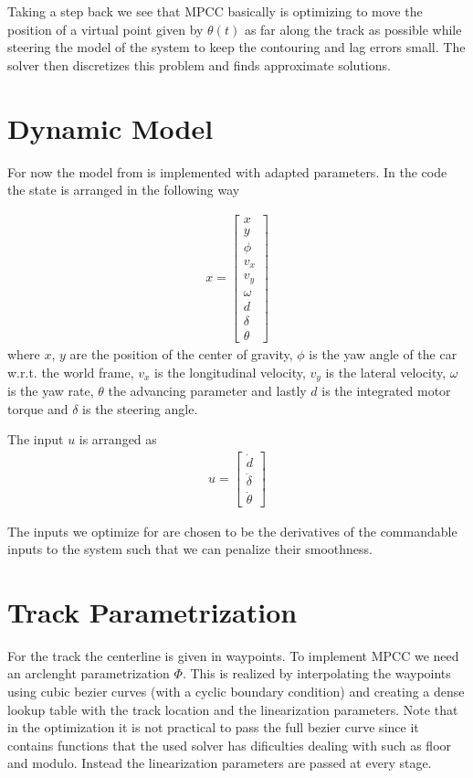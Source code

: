 \documentclass[12pt]{article}
\begin{document}
Taking a step back we see that MPCC basically is optimizing to move the position of a virtual point given by $\theta(t)$ as far along the track as possible while steering the model of the system to keep the contouring and lag errors small. The solver then discretizes this problem and finds approximate solutions.
\section{Dynamic Model}

For now the model from \cite{liniger2015optimization} is implemented with adapted parameters. In the code the state is arranged in the following way

\begin{align}
x = \begin{bmatrix}
x\\
y\\
\phi\\
v_x\\
v_y\\
\omega\\
d\\
\delta\\
\theta
\end{bmatrix}
\end{align}
where $x$, $y$ are the position of the center of gravity, $\phi$ is the yaw angle of the car w.r.t. the world frame, $v_x$ is the longitudinal velocity, $v_y$ is the lateral velocity, $\omega$ is the yaw rate, $\theta$ the advancing parameter and lastly $d$ is the integrated motor torque and $\delta$ is the steering angle.

The input $u$ is arranged as
\begin{align}
u = \begin{bmatrix}
\dot{d}\\
\dot\delta\\
\dot\theta
\end{bmatrix}
\end{align} 

The inputs we optimize for are chosen to be the derivatives of the commandable inputs to the system such that we can penalize their smoothness.

\section{Track Parametrization}

For the track the centerline is given in waypoints. To implement MPCC we need an arclenght parametrization $\Phi$. This is realized by interpolating the waypoints using cubic bezier curves (with a cyclic boundary condition) and creating a dense lookup table with the track location and the linearization parameters. Note that in the optimization it is not practical to pass the  full bezier curve since it contains functions that the used solver has dificulties dealing with such as floor and modulo. Instead the linearization parameters are passed at every stage.   




\end{document}
